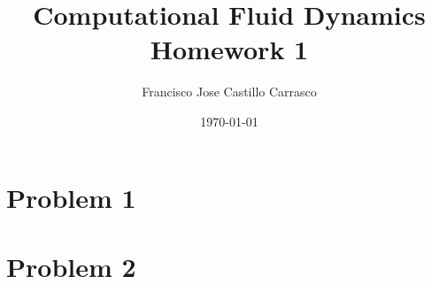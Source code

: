 




\title{Computational Fluid Dynamics\\Homework 1}
\author{Francisco Jose Castillo Carrasco}
\date{\today}
\maketitle




\section*{Problem 1}


\section*{Problem 2}


